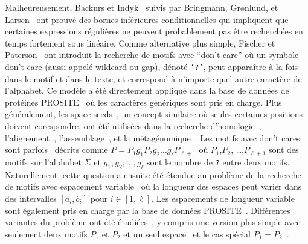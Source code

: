 Malheureusement, Backurs et Indyk~\cite{DBLP:conf/focs/BackursI16} suivis par Bringmann, Gr{\o}nlund, et Larsen~\cite{8104068} ont prouvé des bornes inférieures conditionnelles qui impliquent que certaines expressions régulières ne peuvent probablement pas être recherchées en temps fortement sous linéaire.
Comme alternative plus simple, Fischer et Paterson~\cite{FischerPaterson} ont introduit la recherche de motifs avec ``don't care'' où un symbole don't care (aussi appelé wildcard ou gap), dénoté \texttt{'?'}, peut apparaître à la fois dans le motif et dans le texte, et correspond à n'importe quel autre caractère de l'alphabet.
Ce modèle a été directement appliqué dans la base de données de protéines PROSITE~\cite{hulo2006prosite} où les caractères génériques sont pris en charge. Plus généralement, les space seeds~\cite{li2004patternhunter}, un concept similaire où seules certaines positions doivent corespondre, ont été utilisées dans la recherche d'homologie~\cite{ma2002patternhunter}, l'alignement~\cite{david2011shrimp2}, l'assemblage~\cite{birol2015spaced}, et la métagénomique~\cite{bvrinda2015spaced}.
Les motifs avec don't cares sont parfois~\cite{lewenstein2011indexing} décrits comme $P= P_1g_1P_2g_2 \dots g_\ell P_{\ell+1}$ où $P_1$,$P_2$, \dots,$P_{\ell+1}$ sont des motifs sur l'alphabet $\Sigma$ et $g_1,g_2,\dots,g_{\ell}$ sont le nombre de \texttt{?} entre deux motifs. 
Naturellement, cette question a ensuite été étendue au problème de la recherche de motifs avec espacement variable~\cite{bille2012string,bille2014string} où la longueur des espaces peut varier dans des intervalles $[a_i,b_i]$ pour $i\in[1,\ell]$.
Les espacements de longueur variable sont également pris en charge par la base de données PROSITE~\cite{hulo2006prosite}.
Différentes variantes du problème ont été étudiées~\cite{kopelowitz2016color,cohen2009range,brodal1999finding}, y compris une version plus simple avec seulement deux motifs $P_1$ et $P_2$ et un seul espace~\cite{peterlongo2006gapped,iliopoulos2009indexing} et le cas spécial $P_1=P_2$~\cite{muthukrishnan2002efficient,keller2007range}.

